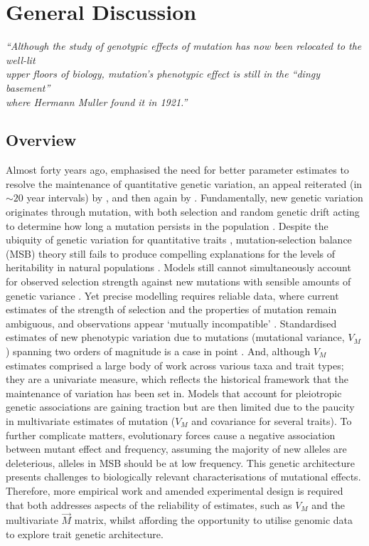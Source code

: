 \chapter{General Discussion}
\begin{center}
    \textit{“Although the study of genotypic effects of mutation has now been relocated to the well-lit \\ upper floors of biology, mutation’s phenotypic effect is still in  the “dingy basement” \\ where Hermann Muller found it in 1921.”} \citet{Houl13}
\end{center}

\section{Overview}
Almost forty years ago, \citet{Ture84} emphasised the need for better parameter estimates to resolve the maintenance of quantitative genetic variation, an appeal reiterated (in $\sim20$ year intervals) by \citet{John05}, and then again by \citet{Wals18c28}. Fundamentally, new genetic variation originates through mutation, with both selection and random genetic drift acting to determine how long a mutation persists in the population \citep{Land75,Kond92, John05, Zhan05}. Despite the ubiquity of genetic variation for quantitative traits \citep{Lync98c7}, mutation-selection balance (MSB) theory still fails to produce compelling explanations for the levels of heritability in natural populations \citep{Wals18c28}. Models still cannot simultaneously account for observed selection strength against new mutations with sensible amounts of genetic variance \citep[thoroughly reviewed by][]{Wals18c28}. Yet precise modelling requires reliable data, where current estimates of the strength of selection and the properties of mutation remain ambiguous, and observations appear ‘mutually incompatible’ \citep{John05}. Standardised estimates of new phenotypic variation due to mutations (mutational variance, $V_M$) spanning two orders of magnitude is a case in point \citep{Houl96,Lync99,Hall09}. And, although $V_M$ estimates comprised a large body of work across various taxa and trait types; they are a univariate measure, which reflects the historical framework that the maintenance of variation has been set in. Models that account for pleiotropic genetic associations are gaining traction \citep{Bart90,John05} but are then limited due to the paucity in multivariate estimates of mutation ($V_M$ and covariance for several traits). To further complicate matters, evolutionary forces cause a negative association between mutant effect and frequency, assuming the majority of new alleles are deleterious, alleles in MSB should be at low frequency. This genetic architecture presents challenges to biologically relevant characterisations of mutational effects. Therefore, more empirical work and amended experimental design is required that both addresses aspects of the reliability of estimates, such as $V_M$ and the multivariate $\vec{M}$ matrix, whilst affording the opportunity to utilise genomic data to explore trait genetic architecture.\par

